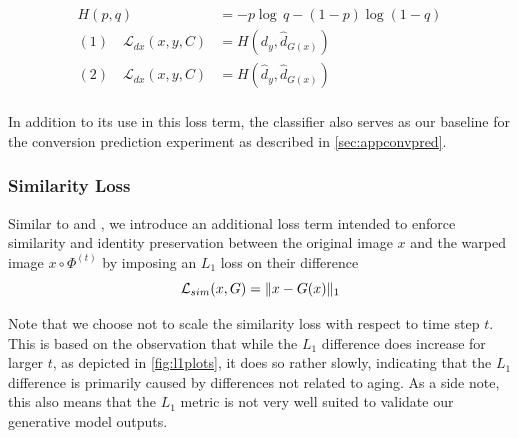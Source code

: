 \begin{equation}
	\begin{split}
		H(p, q) & = -p \log\, q - (1 - p)\log(1 - q) \\[8pt]
		(1) \quad \mathcal{L}_{dx}(x, y, C) & = 
		H(d_y, \hat d_{G(x)}) \\[8pt]
		(2) \quad \mathcal{L}_{dx}(x, y, C) & =
		H(\hat d_y, \hat d_{G(x)}) \\[8pt]
	\end{split}
\end{equation}

In addition to its use in this loss term, the classifier also serves as our baseline for the conversion prediction experiment as described in \autoref{sec:appconvpred}.

\subsubsection*{Similarity Loss}
Similar to \cite{baumgartner2018visual} and \cite{wegmayr}, we introduce an additional loss term intended to enforce similarity and identity preservation between the original image $x$ and the warped image $ x \circ \Phi^{(t)} $ by imposing an $L_1$ loss on their difference
\begin{equation}
	\mathcal{L}_{sim}( x, G ) = \lVert x - G(x) \rVert_1
\end{equation}

Note that we choose not to scale the similarity loss with respect to time step $t$. This is based on the observation that while the $L_1$ difference does increase for larger $t$, as depicted in \autoref{fig:l1plots}, it does so rather slowly, indicating that the $L_1$ difference is primarily caused by differences not related to aging. As a side note, this also means that the $L_1$ metric is not very well suited to validate our generative model outputs.

